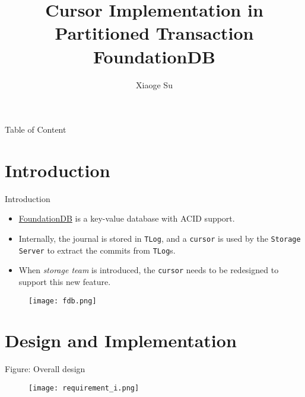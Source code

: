 \documentclass[9pt]{beamer}
\begin{document}
    
    \title{Cursor Implementation in Partitioned Transaction FoundationDB}
    \author{Xiaoge Su}
    \begin{frame}
        \maketitle
    \end{frame}
    
    \begin{frame}{Table of Content}
        \tableofcontents
    \end{frame}
    
    \section{Introduction}
    
    \begin{frame}{Introduction}
        \begin{itemize}
            \item \href{https://www.foundationdb.org}{FoundationDB} is a key-value database with ACID support.
            \item Internally, the journal is stored in \texttt{TLog}, and a \texttt{cursor} is used by the \texttt{Storage Server} to extract the commits from \texttt{TLog}s.
            \item When \emph{storage team} is introduced, the \texttt{cursor} needs to be redesigned to support this new feature.
        \end{itemize}
        \begin{figure}
            \texttt{[image: fdb.png]}
        \end{figure}
    \end{frame}
    
    \section{Design and Implementation}
    
    \begin{frame}{Figure: Overall design}
        \begin{figure}
            \texttt{[image: requirement\_i.png]}
        \end{figure}
    \end{frame}
    
\end{document}
